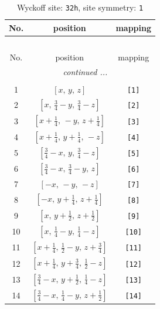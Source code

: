 \documentclass[fleqn,8pt]{jsarticle}
\begin{document}
\renewcommand{\arraystretch}{1.2}
\begin{longtable}{ccc}
\caption{Wyckoff site: {\tt 32h}, site symmetry: {\tt 1}}
 \\
 \hline \hline
No. & position & mapping \\ \hline \endfirsthead

\multicolumn{2}{l}{\tablename\ \thetable{}} \\
 \hline \hline
No. & position & mapping \\ \hline \endhead

 \hline \hline
\multicolumn{2}{r}{\footnotesize\it continued ...} \\ \endfoot

 \hline \hline
\multicolumn{2}{r}{} \\ \endlastfoot

1 & $\left[ x,\, y,\, z \right]$ & {\tt [1]} \\ \hline
2 & $\left[ x,\, \frac{3}{4} - y,\, \frac{3}{4} - z \right]$ & {\tt [2]} \\ \hline
3 & $\left[ x + \frac{1}{4},\, - y,\, z + \frac{1}{4} \right]$ & {\tt [3]} \\ \hline
4 & $\left[ x + \frac{1}{4},\, y + \frac{1}{4},\, - z \right]$ & {\tt [4]} \\ \hline
5 & $\left[ \frac{3}{4} - x,\, y,\, \frac{3}{4} - z \right]$ & {\tt [5]} \\ \hline
6 & $\left[ \frac{3}{4} - x,\, \frac{3}{4} - y,\, z \right]$ & {\tt [6]} \\ \hline
7 & $\left[ - x,\, - y,\, - z \right]$ & {\tt [7]} \\ \hline
8 & $\left[ - x,\, y + \frac{1}{4},\, z + \frac{1}{4} \right]$ & {\tt [8]} \\ \hline
9 & $\left[ x,\, y + \frac{1}{2},\, z + \frac{1}{2} \right]$ & {\tt [9]} \\ \hline
10 & $\left[ x,\, \frac{1}{4} - y,\, \frac{1}{4} - z \right]$ & {\tt [10]} \\ \hline
11 & $\left[ x + \frac{1}{4},\, \frac{1}{2} - y,\, z + \frac{3}{4} \right]$ & {\tt [11]} \\ \hline
12 & $\left[ x + \frac{1}{4},\, y + \frac{3}{4},\, \frac{1}{2} - z \right]$ & {\tt [12]} \\ \hline
13 & $\left[ \frac{3}{4} - x,\, y + \frac{1}{2},\, \frac{1}{4} - z \right]$ & {\tt [13]} \\ \hline
14 & $\left[ \frac{3}{4} - x,\, \frac{1}{4} - y,\, z + \frac{1}{2} \right]$ & {\tt [14]} \\ \hline

\end{longtable}
\end{document}

